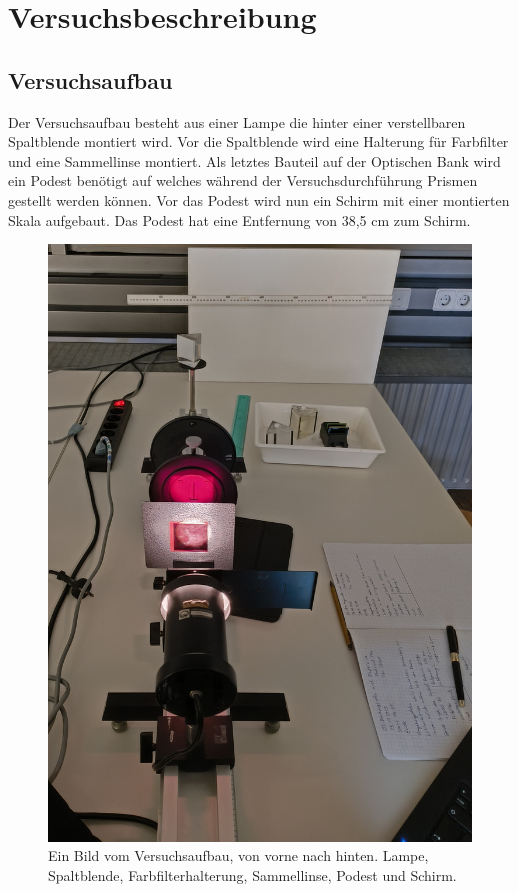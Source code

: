 \section{Versuchsbeschreibung}
\subsection{Versuchsaufbau}
Der Versuchsaufbau besteht aus einer Lampe die hinter einer verstellbaren 
Spaltblende montiert wird. Vor die Spaltblende wird eine Halterung für 
Farbfilter und eine Sammellinse montiert. Als letztes Bauteil auf der 
Optischen Bank wird ein Podest benötigt auf welches während der 
Versuchsdurchführung Prismen gestellt werden können. Vor das Podest wird 
nun ein Schirm mit einer montierten Skala aufgebaut. Das Podest hat eine 
Entfernung von 38,5 cm zum Schirm.
\begin{figure}[!htb]
\centering
\includegraphics[scale=0.08]{Bilder/Richtiger Aufbau.jpg}
\caption{Ein Bild vom Versuchsaufbau, von vorne nach hinten. Lampe, Spaltblende, Farbfilterhalterung, Sammellinse, Podest und Schirm.}
\end{figure}


